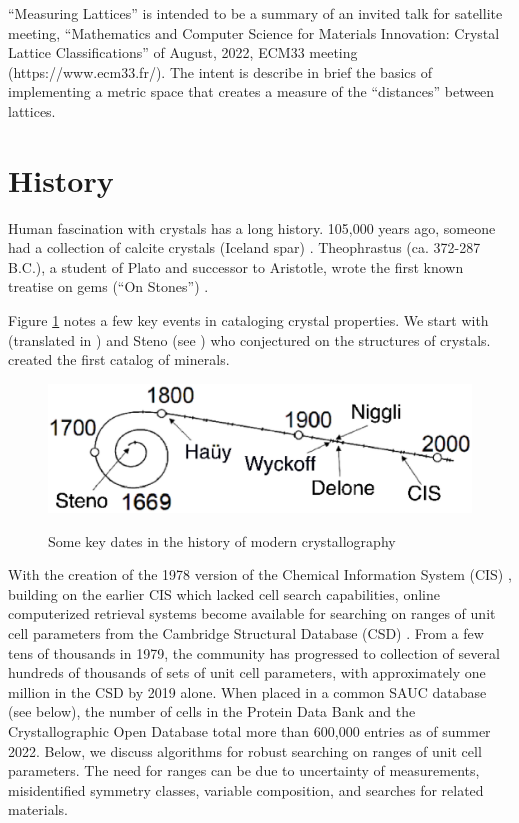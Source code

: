 \documentclass[preprint]{iucr}              %
\numberwithin{equation}{section}
\begin{document}
	``Measuring Lattices'' is intended to be a summary of an invited talk
	for satellite meeting, ``Mathematics and Computer Science for Materials Innovation: Crystal Lattice Classifications'' of August, 2022, ECM33
	meeting (https://www.ecm33.fr/). The intent is describe in brief
	the basics of implementing a metric space that creates
	a measure of the ``distances'' between lattices.
	
	\section{History}
	
	Human fascination with crystals has a long history. 105,000 years ago,
	someone had a collection of calcite crystals 
	(Iceland spar) \cite{wilkins2021innovative}. 
	Theophrastus (ca. 372-287 B.C.), a student of Plato and successor to Aristotle, wrote the first known treatise on gems (``On Stones'')  \cite{enwiki:1114534722}.
	
	Figure \ref{timeline} notes a few key events in cataloging 
	crystal properties. We start with  (translated in ) and Steno  (see ) who
	conjectured on the structures of crystals.   created the first catalog of minerals.
	
\begin{figure}
	\includegraphics[width=\textwidth]{TimeLine_rev}
	\label{timeline}
	\caption{Some key dates in the history of modern crystallography}
\end{figure}

	With the creation of the 1978 version of the Chemical Information System (CIS)  \cite{bernstein1979nih},
	building on the earlier CIS \cite{feldmann1972application} which lacked cell search capabilities,
	online computerized retrieval systems become
	available for searching on ranges of unit cell parameters from
	the Cambridge Structural Database (CSD) \cite{kennard1977computer}. From 
	a few tens of thousands in 1979, the community has progressed to 
	collection of several hundreds of thousands of sets of
	unit cell parameters, with approximately one million in the
	CSD by 2019 \cite{taylor2019million} alone.  When placed in
	a common SAUC database (see below), the number of cells in the 
	Protein Data Bank and the Crystallographic Open Database total
	more than 600,000 entries as of summer 2022.   Below, we discuss algorithms for 
	robust searching on ranges of unit cell parameters. The need for
	ranges can be due to uncertainty of measurements, misidentified
	symmetry classes, variable composition, and searches for
	related materials.
	
\end{document}
